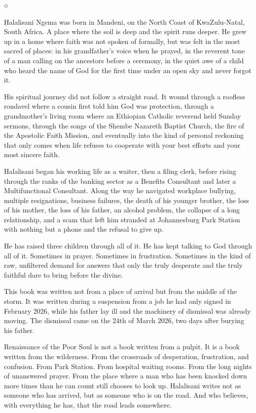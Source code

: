 ○

Halalisani Ngema was born in Mandeni, on the North Coast of
KwaZulu-Natal, South Africa. A place where the soil is deep and the
spirit runs deeper. He grew up in a home where faith was not spoken of
formally, but was felt in the most sacred of places: in his
grandfather's voice when he prayed, in the reverent tone of a man
calling on the ancestors before a ceremony, in the quiet awe of a child
who heard the name of God for the first time under an open sky and never
forgot it.

His spiritual journey did not follow a straight road. It wound through a
roofless rondavel where a cousin first told him God was protection,
through a grandmother's living room where an Ethiopian Catholic reverend
held Sunday sermons, through the songs of the Shembe Nazareth Baptist
Church, the fire of the Apostolic Faith Mission, and eventually into the
kind of personal reckoning that only comes when life refuses to
cooperate with your best efforts and your most sincere faith.

Halalisani began his working life as a waiter, then a filing clerk,
before rising through the ranks of the banking sector as a Benefits
Consultant and later a Multifunctional Consultant. Along the way he
navigated workplace bullying, multiple resignations, business failures,
the death of his younger brother, the loss of his mother, the loss of
his father, an alcohol problem, the collapse of a long relationship, and
a scam that left him stranded at Johannesburg Park Station with nothing
but a phone and the refusal to give up.

He has raised three children through all of it. He has kept talking to
God through all of it. Sometimes in prayer. Sometimes in frustration.
Sometimes in the kind of raw, unfiltered demand for answers that only
the truly desperate and the truly faithful dare to bring before the
divine.

This book was written not from a place of arrival but from the middle of
the storm. It was written during a suspension from a job he had only
signed in February 2026, while his father lay ill and the machinery of
dismissal was already moving. The dismissal came on the 24th of March
2026, two days after burying his father.

Renaissance of the Poor Soul is not a book written from a pulpit. It is
a book written from the wilderness. From the crossroads of desperation,
frustration, and confusion. From Park Station. From hospital waiting
rooms. From the long nights of unanswered prayer. From the place where a
man who has been knocked down more times than he can count still chooses
to look up. Halalisani writes not as someone who has arrived, but as
someone who is on the road. And who believes, with everything he has,
that the road leads somewhere.

